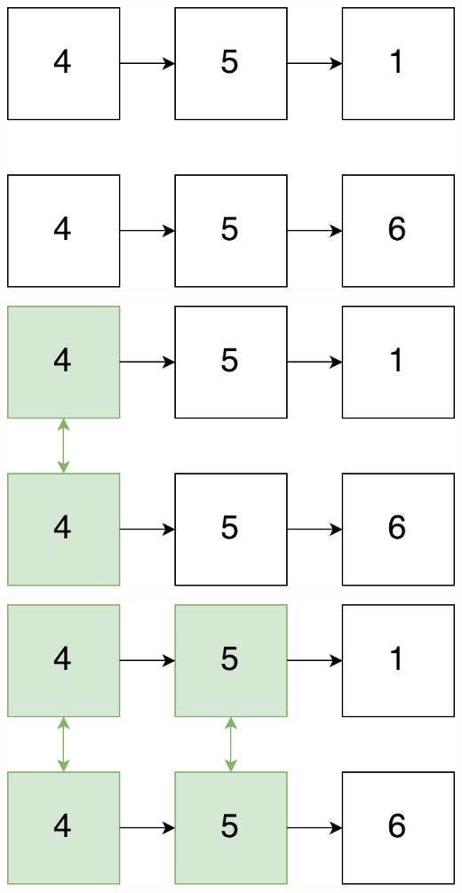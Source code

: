 \documentclass[usenames,dvipsnames,svgnames,table,aspectratio=169,mathserif]{beamer}
\begin{document}
\begin{frame}
\begin{center}
\includegraphics[scale=0.5]{listcompare1.pdf}
\end{center}
\end{frame}
\begin{frame}
\begin{center}
\includegraphics[scale=0.5]{listcompare2.pdf}
\end{center}
\end{frame}
\begin{frame}
\begin{center}
\includegraphics[scale=0.5]{listcompare3.pdf}
\end{center}
\end{frame}
\end{document}
